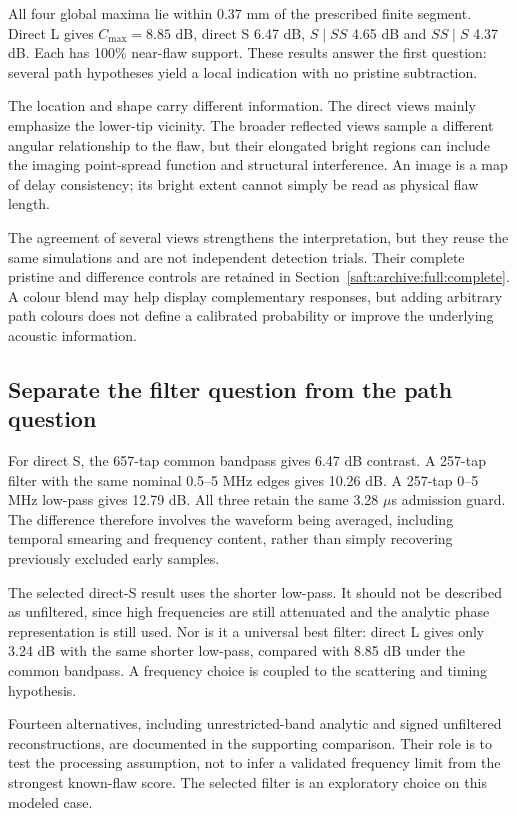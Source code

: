 \documentclass[11pt]{article}
\begin{document}
All four global maxima lie within 0.37 mm of the prescribed finite segment. Direct L gives $C_{\max}=8.85$ dB, direct S 6.47 dB, $S\mid SS$ 4.65 dB and $SS\mid S$ 4.37 dB. Each has 100\% near-flaw support. These results answer the first question: several path hypotheses yield a local indication with no pristine subtraction.

The location and shape carry different information. The direct views mainly emphasize the lower-tip vicinity. The broader reflected views sample a different angular relationship to the flaw, but their elongated bright regions can include the imaging point-spread function and structural interference. An image is a map of delay consistency; its bright extent cannot simply be read as physical flaw length.

The agreement of several views strengthens the interpretation, but they reuse the same simulations and are not independent detection trials. Their complete pristine and difference controls are retained in Section~\ref{saft:archive:full:complete}. A colour blend may help display complementary responses, but adding arbitrary path colours does not define a calibrated probability or improve the underlying acoustic information.

\subsection{Separate the filter question from the path question}
For direct S, the 657-tap common bandpass gives 6.47 dB contrast. A 257-tap filter with the same nominal 0.5--5 MHz edges gives 10.26 dB. A 257-tap 0--5 MHz low-pass gives 12.79 dB. All three retain the same 3.28 $\mu$s admission guard. The difference therefore involves the waveform being averaged, including temporal smearing and frequency content, rather than simply recovering previously excluded early samples.

The selected direct-S result uses the shorter low-pass. It should not be described as unfiltered, since high frequencies are still attenuated and the analytic phase representation is still used. Nor is it a universal best filter: direct L gives only 3.24 dB with the same shorter low-pass, compared with 8.85 dB under the common bandpass. A frequency choice is coupled to the scattering and timing hypothesis.

Fourteen alternatives, including unrestricted-band analytic and signed unfiltered reconstructions, are documented in the supporting comparison. Their role is to test the processing assumption, not to infer a validated frequency limit from the strongest known-flaw score. The selected filter is an exploratory choice on this modeled case.
\end{document}
